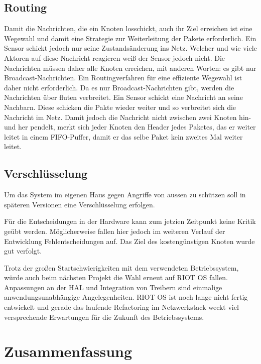\documentclass{IEEEtran}
\begin{document}
    \subsection{Routing}
        Damit die Nachrichten, die ein Knoten losschickt, auch ihr Ziel 
        erreichen ist eine Wegewahl und damit eine Strategie zur Weiterleitung 
        der Pakete erforderlich. Ein Sensor schickt jedoch nur seine 
        Zustandsänderung ins Netz. Welcher und wie viele Aktoren auf diese 
        Nachricht reagieren weiß der Sensor jedoch nicht. Die Nachrichten müssen 
        daher alle Knoten erreichen, mit anderen Worten: es gibt nur 
        Broadcast-Nachrichten. Ein Routingverfahren für eine effiziente Wegewahl 
        ist daher nicht erforderlich.
        Da es nur Broadcast-Nachrichten gibt, werden die Nachrichten über fluten 
        verbreitet. Ein Sensor schickt eine Nachricht an seine Nachbarn. Diese 
        schicken die Pakte wieder weiter und so verbreitet sich die Nachricht im 
        Netz. Damit jedoch die Nachricht nicht zwischen zwei Knoten hin- und 
        her pendelt, merkt sich jeder Knoten den Header jedes Paketes, das er 
        weiter leitet in einem FIFO-Puffer, damit er das selbe Paket kein 
        zweites Mal weiter leitet.
        

    \subsection{Verschlüsselung}
    Um das System im eigenen Haus gegen Angriffe von aussen zu schützen soll in 
    späteren Versionen eine Verschlüsselung erfolgen. 





Für die Entscheidungen in der Hardware kann zum jetzien Zeitpunkt keine Kritik geübt werden. Möglicherweise fallen hier jedoch im weiteren Verlauf der Entwicklung Fehlentscheidungen auf. Das Ziel des kostengünstigen Knoten wurde gut verfolgt.

Trotz der großen Startschwierigkeiten mit dem verwendeten Betriebssystem, würde auch beim nächsten Projekt die Wahl erneut auf RIOT OS fallen. Anpassungen an der \ac{HAL} und Integration von Treibern sind einmalige anwendungsunabhängige Angelegenheiten. RIOT OS ist noch lange nicht fertig entwickelt und gerade das laufende Refactoring im Netzwerkstack weckt viel versprechende Erwartungen für die Zukunft des Betriebssystems.


\section{Zusammenfassung}
\end{document}
